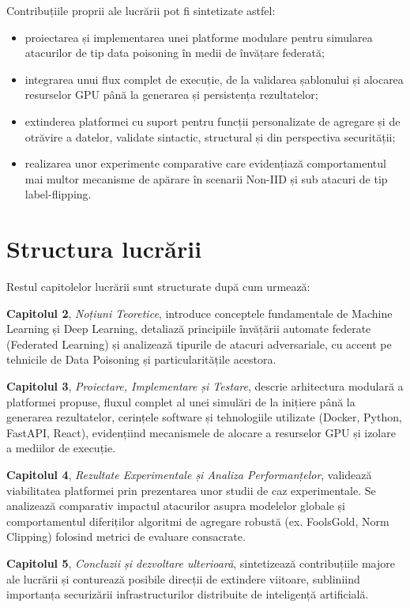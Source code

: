 \documentclass[../../main.tex]{subfiles}
\begin{document}
Contribuțiile proprii ale lucrării pot fi sintetizate astfel:

\begin{itemize}
    \item proiectarea și implementarea unei platforme modulare pentru simularea atacurilor de tip data poisoning în medii de învățare federată;
    \item integrarea unui flux complet de execuție, de la validarea șablonului și alocarea resurselor GPU până la generarea și persistența rezultatelor;
    \item extinderea platformei cu suport pentru funcții personalizate de agregare și de otrăvire a datelor, validate sintactic, structural și din perspectiva securității;
    \item realizarea unor experimente comparative care evidențiază comportamentul mai multor mecanisme de apărare în scenarii Non-IID și sub atacuri de tip label-flipping.
\end{itemize}


\section{Structura lucrării}

Restul capitolelor lucrării sunt structurate după cum urmează:

\textbf{Capitolul 2}, \textit{Noțiuni Teoretice}, introduce conceptele fundamentale de Machine Learning și Deep Learning, detaliază principiile învățării automate federate (Federated Learning) și analizează tipurile de atacuri adversariale, cu accent pe tehnicile de Data Poisoning și particularitățile acestora.

\textbf{Capitolul 3}, \textit{Proiectare, Implementare și Testare}, descrie arhitectura modulară a platformei propuse, fluxul complet al unei simulări de la inițiere până la generarea rezultatelor, cerințele software și tehnologiile utilizate (Docker, Python, FastAPI, React), evidențiind mecanismele de alocare a resurselor GPU și izolare a mediilor de execuție.

\textbf{Capitolul 4}, \textit{Rezultate Experimentale și Analiza Performanțelor}, validează viabilitatea platformei prin prezentarea unor studii de caz experimentale. Se analizează comparativ impactul atacurilor asupra modelelor globale și comportamentul diferiților algoritmi de agregare robustă (ex. FoolsGold, Norm Clipping) folosind metrici de evaluare consacrate.

\textbf{Capitolul 5}, \textit{Concluzii și dezvoltare ulterioară}, sintetizează contribuțiile majore ale lucrării și conturează posibile direcții de extindere viitoare, subliniind importanța securizării infrastructurilor distribuite de inteligență artificială.
\end{document}
